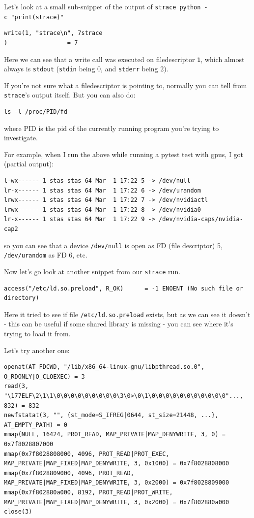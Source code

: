 \documentclass[
]{report}
\begin{document}
Let's look at a small sub-snippet of the output of
\texttt{strace\ python\ -c\ "print(\textquotesingle{}strace\textquotesingle{})"}

\begin{verbatim}
write(1, "strace\n", 7strace
)                 = 7
\end{verbatim}

Here we can see that a write call was executed on filedescriptor
\texttt{1}, which almost always is \texttt{stdout} (\texttt{stdin} being
0, and \texttt{stderr} being 2).

If you're not sure what a filedescriptor is pointing to, normally you
can tell from \texttt{strace}'s output itself. But you can also do:

\begin{verbatim}
ls -l /proc/PID/fd
\end{verbatim}

where PID is the pid of the currently running program you're trying to
investigate.

For example, when I run the above while running a pytest test with gpus,
I got (partial output):

\begin{verbatim}
l-wx------ 1 stas stas 64 Mar  1 17:22 5 -> /dev/null
lr-x------ 1 stas stas 64 Mar  1 17:22 6 -> /dev/urandom
lrwx------ 1 stas stas 64 Mar  1 17:22 7 -> /dev/nvidiactl
lrwx------ 1 stas stas 64 Mar  1 17:22 8 -> /dev/nvidia0
lr-x------ 1 stas stas 64 Mar  1 17:22 9 -> /dev/nvidia-caps/nvidia-cap2
\end{verbatim}

so you can see that a device \texttt{/dev/null} is open as FD (file
descriptor) 5, \texttt{/dev/urandom} as FD 6, etc.

Now let's go look at another snippet from our \texttt{strace} run.

\begin{verbatim}
access("/etc/ld.so.preload", R_OK)      = -1 ENOENT (No such file or directory)
\end{verbatim}

Here it tried to see if file \texttt{/etc/ld.so.preload} exists, but as
we can see it doesn't - this can be useful if some shared library is
missing - you can see where it's trying to load it from.

Let's try another one:

\begin{verbatim}
openat(AT_FDCWD, "/lib/x86_64-linux-gnu/libpthread.so.0", O_RDONLY|O_CLOEXEC) = 3
read(3, "\177ELF\2\1\1\0\0\0\0\0\0\0\0\0\3\0>\0\1\0\0\0\0\0\0\0\0\0\0\0"..., 832) = 832
newfstatat(3, "", {st_mode=S_IFREG|0644, st_size=21448, ...}, AT_EMPTY_PATH) = 0
mmap(NULL, 16424, PROT_READ, MAP_PRIVATE|MAP_DENYWRITE, 3, 0) = 0x7f8028807000
mmap(0x7f8028808000, 4096, PROT_READ|PROT_EXEC, MAP_PRIVATE|MAP_FIXED|MAP_DENYWRITE, 3, 0x1000) = 0x7f8028808000
mmap(0x7f8028809000, 4096, PROT_READ, MAP_PRIVATE|MAP_FIXED|MAP_DENYWRITE, 3, 0x2000) = 0x7f8028809000
mmap(0x7f802880a000, 8192, PROT_READ|PROT_WRITE, MAP_PRIVATE|MAP_FIXED|MAP_DENYWRITE, 3, 0x2000) = 0x7f802880a000
close(3)
\end{verbatim}
\end{document}
